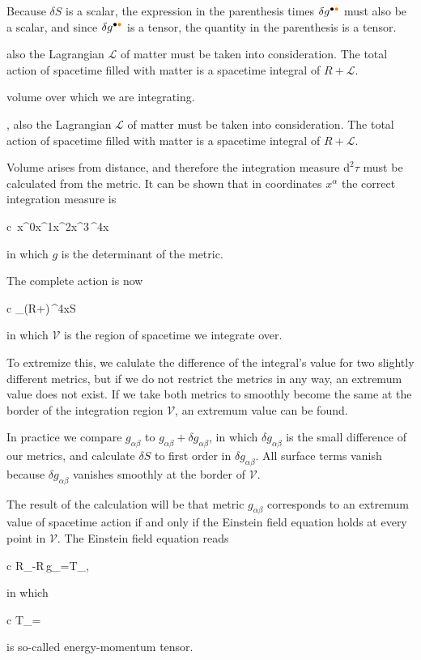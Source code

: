 \documentclass[11pt,oneside%
]{memoir}
\newenvironment{eqna}{\begin{IEEEeqnarray*}{c}}{\end{IEEEeqnarray*}\ignorespacesafterend}
\newcommand{\dd}{\mathrm{d}}
\newcommand{\coa}{{\color{black}\bullet}}
\newcommand{\cob}{{\color{oranssi}\bullet}}
\begin{document}
Because \(\delta S\) is a scalar, the expression in the parenthesis times \(\delta g^{\coa\cob}\) must also be a scalar, and since \(\delta g^{\coa\cob}\) is a tensor, the quantity in the parenthesis is a tensor. 



 also the Lagrangian \(\mathcal{L}\) of matter must be taken into consideration. The total action of spacetime filled with matter is a spacetime integral of \(R+\mathcal{L}\).

volume over which we are integrating.


, also the Lagrangian \(\mathcal{L}\) of matter must be taken into consideration. The total action of spacetime filled with matter is a spacetime integral of \(R+\mathcal{L}\).

Volume arises from distance, and therefore the integration measure \(\dd^2\tau\) must be calculated from the metric. It can be shown that in coordinates \(x^\alpha\) the correct integration measure is
\begin{eqna}
\,\dd x^0\dd x^1\dd x^2\dd x^3\doteq{}\,\dd^4x
\end{eqna}
in which \(g\) is the determinant of the metric.

The complete action is now
\begin{eqna}
\int_(R+)\,\dd^4x\doteq S
\end{eqna}
in which \(\mathcal{V}\) is the region of spacetime we integrate over.


To extremize this, we calulate the difference of the integral's value for two slightly different metrics, but if we do not restrict the metrics in any way, an extremum value does not exist. If we take both metrics to smoothly become the same at the border of the integration region \(\mathcal{V}\), an extremum value can be found.

In practice we compare \(g_{\alpha\beta}\) to \(g_{\alpha\beta}+\delta g_{\alpha\beta}\), in which \(\delta g_{\alpha\beta}\) is the small difference of our metrics, and calculate \(\delta S\) to first order in \(\delta g_{\alpha\beta}\). All surface terms vanish because \(\delta g_{\alpha\beta}\) vanishes smoothly at the border of \(\mathcal{V}\).






The result of the calculation will be that metric \(g_{\alpha\beta}\) corresponds to an extremum value of spacetime action if and only if the Einstein field equation holds at every point in \(\mathcal{V}\). The Einstein field equation reads
\begin{eqna}
R_{\alpha\beta}-R\,g_{\alpha\beta}=T_{\alpha\beta},%
\end{eqna}
in which
\begin{eqna}
T_{\alpha\beta}=
\end{eqna}
is so-called energy-momentum tensor.
\end{document}
